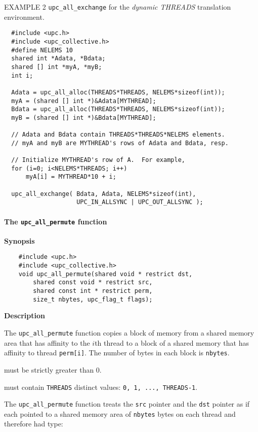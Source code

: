 \np EXAMPLE 2 {\tt upc\_all\_exchange} for the {\em dynamic THREADS}
translation environment.

\begin{verbatim}
  #include <upc.h>
  #include <upc_collective.h>
  #define NELEMS 10
  shared int *Adata, *Bdata;
  shared [] int *myA, *myB;
  int i;

  Adata = upc_all_alloc(THREADS*THREADS, NELEMS*sizeof(int));
  myA = (shared [] int *)&Adata[MYTHREAD];
  Bdata = upc_all_alloc(THREADS*THREADS, NELEMS*sizeof(int));
  myB = (shared [] int *)&Bdata[MYTHREAD];

  // Adata and Bdata contain THREADS*THREADS*NELEMS elements.
  // myA and myB are MYTHREAD's rows of Adata and Bdata, resp.

  // Initialize MYTHREAD's row of A.  For example,
  for (i=0; i<NELEMS*THREADS; i++)
      myA[i] = MYTHREAD*10 + i;

  upc_all_exchange( Bdata, Adata, NELEMS*sizeof(int),
                    UPC_IN_ALLSYNC | UPC_OUT_ALLSYNC );
\end{verbatim}

\paragraph{The {\tt upc\_all\_permute} function}

{\bf Synopsis} 

\npf\vspace{-2.5em}
\begin{verbatim}
    #include <upc.h>
    #include <upc_collective.h>
    void upc_all_permute(shared void * restrict dst,
        shared const void * restrict src, 
        shared const int * restrict perm,
        size_t nbytes, upc_flag_t flags);
\end{verbatim}

{\bf Description} 

\np The {\tt upc\_all\_permute} function copies a block of memory from a
shared memory area that has affinity to the $i$th thread to a block of a
shared memory that has affinity to thread {\tt perm[i]}.
The number of bytes in each block is {\tt nbytes}.

 must be strictly greater than 0.

 must contain {\tt THREADS} distinct
values: {\tt 0, 1, ...,  THREADS-1}.

\np The {\tt upc\_all\_permute} function treats the {\tt src} pointer
and the {\tt dst} pointer as if each pointed to a shared memory
area of {\tt nbytes} bytes on each thread and therefore had type:

